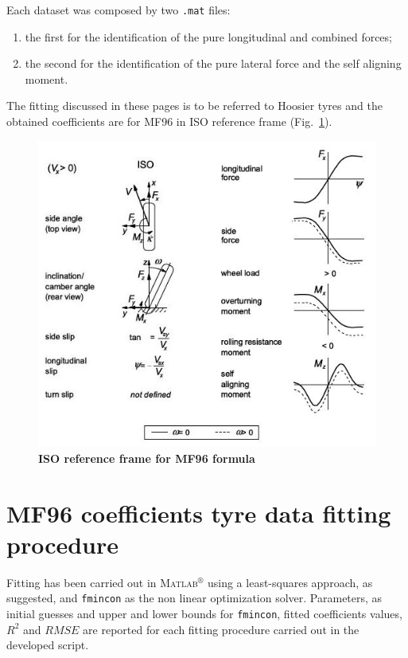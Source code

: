 \documentclass{IEEEtran}
\begin{document}
    Each dataset was composed by two \texttt{.mat} files:
      \begin{enumerate}
            \item the first for the identification of the pure longitudinal and combined forces;
            \item the second for the identification of the pure lateral force and the self aligning moment.\\
        \end{enumerate} 

        The fitting discussed in these pages is to be referred to Hoosier tyres and the obtained coefficients are for MF96 in ISO reference frame (Fig.~\ref{fig:ISO}).
        
     
        \begin{figure}[htbp]
            \centerline{\includegraphics[width= \columnwidth]{ISO.JPG}}
            \caption{\textbf{ISO reference frame for MF96 formula}
            }
            \label{fig:ISO}
        \end{figure}
    
        \newpage
    
    \section{\textbf{MF96 coefficients tyre data fitting procedure}}
        Fitting has been carried out in \textsc{Matlab}$^{\circledR}$ using a least-squares approach, as suggested, and \texttt{fmincon} as the non linear optimization solver. Parameters, as initial guesses and upper and lower bounds for \texttt{fmincon}, fitted coefficients values, $R^{2}$ and $RMSE$ are reported for each fitting procedure carried out in the developed script.
\end{document}

